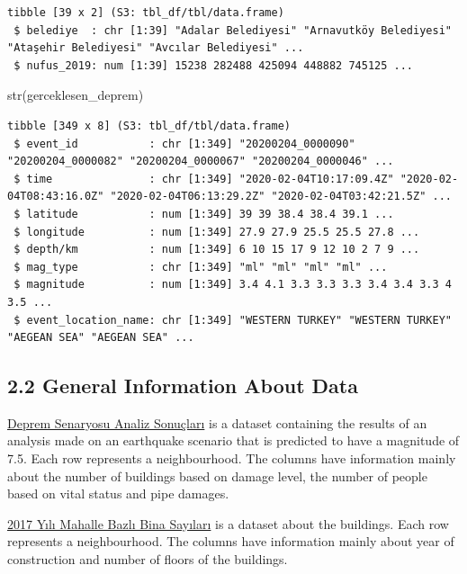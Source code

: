 \documentclass[
  11pt,
  a4paper,
  DIV=11,
  numbers=noendperiod]{scrartcl}
\newenvironment{Shaded}{\begin{snugshade}}{\end{snugshade}}
\newcommand{\FunctionTok}[1]{\textcolor[rgb]{0.28,0.35,0.67}{#1}}
\newcommand{\NormalTok}[1]{\textcolor[rgb]{0.00,0.23,0.31}{#1}}
\begin{document}
\begin{verbatim}
tibble [39 x 2] (S3: tbl_df/tbl/data.frame)
 $ belediye  : chr [1:39] "Adalar Belediyesi" "Arnavutköy Belediyesi" "Ataşehir Belediyesi" "Avcılar Belediyesi" ...
 $ nufus_2019: num [1:39] 15238 282488 425094 448882 745125 ...
\end{verbatim}

\begin{Shaded}
\begin{Highlighting}[]
\FunctionTok{str}\NormalTok{(gerceklesen\_deprem)}
\end{Highlighting}
\end{Shaded}

\begin{verbatim}
tibble [349 x 8] (S3: tbl_df/tbl/data.frame)
 $ event_id           : chr [1:349] "20200204_0000090" "20200204_0000082" "20200204_0000067" "20200204_0000046" ...
 $ time               : chr [1:349] "2020-02-04T10:17:09.4Z" "2020-02-04T08:43:16.0Z" "2020-02-04T06:13:29.2Z" "2020-02-04T03:42:21.5Z" ...
 $ latitude           : num [1:349] 39 39 38.4 38.4 39.1 ...
 $ longitude          : num [1:349] 27.9 27.9 25.5 25.5 27.8 ...
 $ depth/km           : num [1:349] 6 10 15 17 9 12 10 2 7 9 ...
 $ mag_type           : chr [1:349] "ml" "ml" "ml" "ml" ...
 $ magnitude          : num [1:349] 3.4 4.1 3.3 3.3 3.3 3.4 3.4 3.3 4 3.5 ...
 $ event_location_name: chr [1:349] "WESTERN TURKEY" "WESTERN TURKEY" "AEGEAN SEA" "AEGEAN SEA" ...
\end{verbatim}

\hypertarget{general-information-about-data}{%
\subsection{2.2 General Information About
Data}\label{general-information-about-data}}

\href{https://data.ibb.gov.tr/dataset/deprem-senaryosu-analiz-sonuclari/resource/9c3ac492-de4b-4245-b418-7ad3df67a193}{Deprem
Senaryosu Analiz Sonuçları} is a dataset containing the results of an
analysis made on an earthquake scenario that is predicted to have a
magnitude of 7.5. Each row represents a neighbourhood. The columns have
information mainly about the number of buildings based on damage level,
the number of people based on vital status and pipe damages.

\href{https://data.ibb.gov.tr/dataset/mahalle-bazli-bina-analiz-verisi/resource/cef193d5-0bd2-4e8d-8a69-275c50288875}{2017
Yılı Mahalle Bazlı Bina Sayıları} is a dataset about the buildings. Each
row represents a neighbourhood. The columns have information mainly
about year of construction and number of floors of the buildings.
\end{document}
